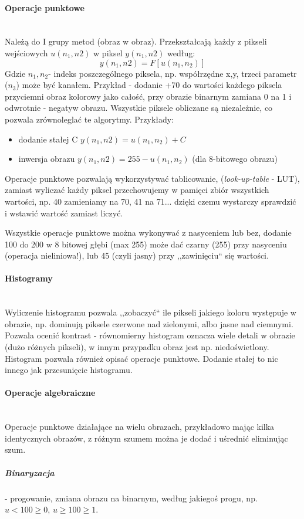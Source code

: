 \documentclass[]{report}
\begin{document}
\paragraph{Operacje punktowe\\\\}
Należą do I grupy metod (obraz w obraz). Przekształcają każdy z pikseli wejściowych $ u(n_1,n2) $ w piksel $ y(n_1,n2) $ według:
$$ y(n_1,n2) = F[u(n_1,n_2)] $$
Gdzie $n_1, n_2 $- indeks poszczególnego piksela, np. współrzędne x,y, trzeci parametr ($n_3$) może być kanałem.
Przykład - dodanie +70 do wartości każdego piksela przyciemni obraz kolorowy jako całość, przy obrazie binarnym zamiana 0 na 1 i odwrotnie - negatyw obrazu.
Wszystkie piksele obliczane są niezależnie, co pozwala zrównoleglać te algorytmy. Przykłady:
\begin{itemize}
	\item dodanie stałej C $ y(n_1,n2) = u(n_1,n_2) + C $
	\item inwersja obrazu  $ y(n_1,n2) = 255 - u(n_1,n_2) $ (dla 8-bitowego obrazu)
\end{itemize} 
Operacje punktowe pozwalają wykorzystywać tablicowanie, (\textit{look-up-table} - LUT), zamiast wyliczać każdy piksel przechowujemy w pamięci zbiór wszystkich wartości, np. 40 zamieniamy na 70, 41 na 71... dzięki czemu wystarczy sprawdzić i wstawić wartość zamiast liczyć.

Wszystkie operacje punktowe można wykonywać z nasyceniem lub bez, dodanie 100 do 200 w 8 bitowej głębi (max 255) może dać czarny (255) przy nasyceniu (operacja nieliniowa!), lub 45 (czyli jasny) przy ,,zawinięciu`` się wartości.
\paragraph{Histogramy\\\\}
Wyliczenie histogramu pozwala ,,zobaczyć`` ile pikseli jakiego koloru występuje w obrazie, np. dominują piksele czerwone nad zielonymi, albo jasne nad ciemnymi.
Pozwala ocenić kontrast - równomierny histogram oznacza wiele detali w obrazie (dużo różnych pikseli), w innym przypadku obraz jest np. niedoświetlony. Histogram pozwala również opisać operacje punktowe. Dodanie stałej to nic innego jak przesunięcie histogramu.
\paragraph{Operacje algebraiczne\\\\}
Operacje punktowe działające na wielu obrazach, przykładowo mając kilka identycznych obrazów, z różnym szumem można je dodać i uśrednić eliminując szum.
\subparagraph{Binaryzacja} - progowanie, zmiana obrazu na binarnym, według jakiegoś progu, np. $u<100 \ge 0$, $u \ge 100 \ge 1$.
\end{document}
